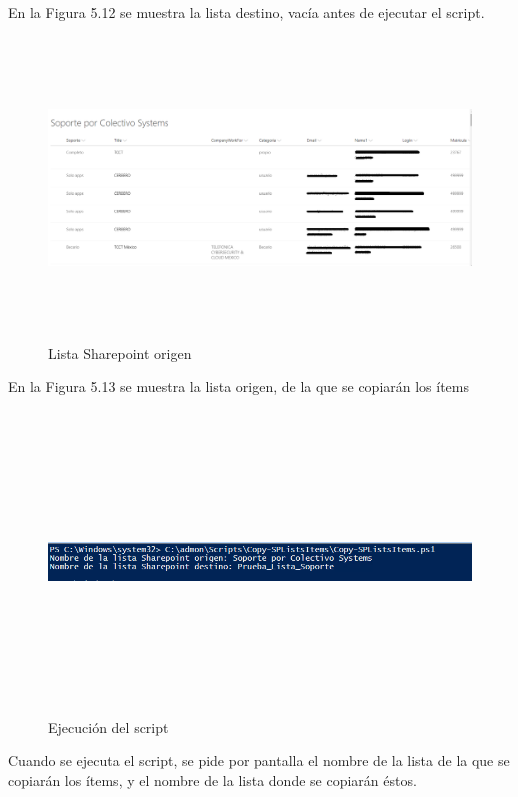\documentclass[a4paper, 12pt]{book}
\begin{document}
\begin{itemize}
En la Figura 5.12 se muestra la lista destino, vacía antes de ejecutar el script.

\begin{figure}[H]
	\centering
	\includegraphics[width=15cm, height=8cm, keepaspectratio]{img/image13.png}
	\caption{Lista Sharepoint origen}
	\label{fig:image13}
\end{figure}

En la Figura 5.13 se muestra la lista origen, de la que se copiarán los ítems

\begin{figure}[H]
	\centering
	\includegraphics[width=15cm, height=8cm, keepaspectratio]{img/image14.png}
	\caption{Ejecución del script}
	\label{fig:image14}
\end{figure}

Cuando se ejecuta el script, se pide por pantalla el nombre de la lista de la que se copiarán los ítems, y el nombre de la lista donde se copiarán éstos.


\end{itemize}
\end{document}
